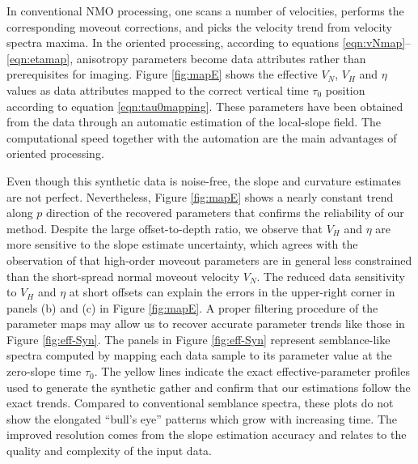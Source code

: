 In conventional NMO processing, one scans a number of velocities,
performs the corresponding moveout corrections, and picks the velocity
trend from velocity spectra maxima. In the oriented processing,
according to equations \ref{eqn:vNmap}--\ref{eqn:etamap}, anisotropy
parameters become data attributes rather than prerequisites for
imaging. Figure \ref{fig:mapE} shows the effective $V_{N}$, $V_{H}$
and $\eta$ values as data attributes mapped to the correct vertical
time $\tau _{0}$ position according to equation
\ref{eqn:tau0mapping}. These parameters have been obtained from the
data through an automatic estimation of the local-slope field. The
computational speed together with the automation are the main
advantages of oriented processing.

Even though this synthetic data is noise-free, the slope and curvature
estimates are not perfect. Nevertheless, Figure \ref{fig:mapE} shows a
nearly constant trend along $p$ direction of the recovered parameters
that confirms the reliability of our method. Despite the large offset-to-depth ratio, we observe that $V_{H}$
and $\eta$ are more sensitive to the slope estimate uncertainty, which agrees with
the observation of \cite{ilyabook2006} that high-order moveout
parameters are in general less constrained than the short-spread
normal moveout velocity ${V}_{N}$. The reduced data sensitivity to
$V_{H}$ and $\eta$ at short offsets can explain the errors in the
upper-right corner in panels (b) and (c) in Figure \ref{fig:mapE}. A
proper filtering procedure of the parameter maps may allow us to recover accurate parameter trends like
those in Figure \ref{fig:eff-Syn}. The panels in Figure
\ref{fig:eff-Syn} represent semblance-like spectra computed by mapping
each data sample to its parameter value at the zero-slope time $\tau
_{0}$.  The yellow lines indicate the exact effective-parameter
profiles used to generate the synthetic gather and confirm that our
estimations follow the exact trends. Compared to conventional
semblance spectra, these plots do not show the elongated ``bull's
eye'' patterns which grow with increasing time.  The improved
resolution comes from the slope estimation accuracy and relates to the
quality and complexity of the input data.
%






